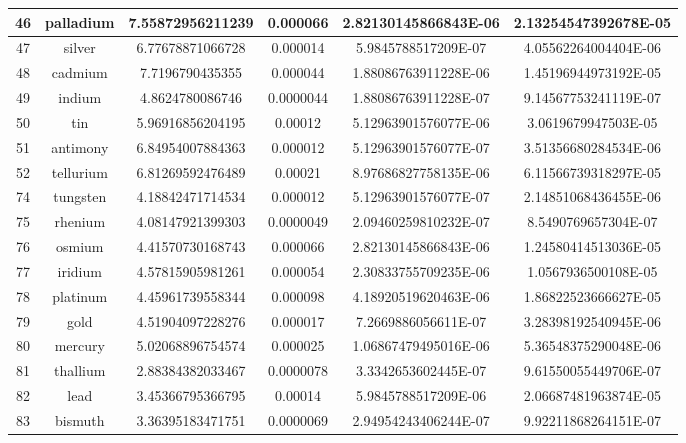 \documentclass[a4paper]{article}
\begin{document}
\begin{center}
\begin{tabular}{|c|c|c|c|c|c|}
			\hline
			46 & palladium & 7.55872956211239 & 0.000066 & 2.82130145866843E-06 & 2.13254547392678E-05 \\
			\hline
			47 & silver & 6.77678871066728 & 0.000014 & 5.9845788517209E-07 & 4.05562264004404E-06 \\
			\hline
			48 & cadmium & 7.7196790435355 & 0.000044 & 1.88086763911228E-06 & 1.45196944973192E-05 \\
			\hline
			49 & indium & 4.8624780086746 & 0.0000044 & 1.88086763911228E-07 & 9.14567753241119E-07 \\
			\hline
			50 & tin & 5.96916856204195 & 0.00012 & 5.12963901576077E-06 & 3.0619679947503E-05 \\
			\hline
			51 & antimony & 6.84954007884363 & 0.000012 & 5.12963901576077E-07 & 3.51356680284534E-06 \\
			\hline
			52 & tellurium & 6.81269592476489 & 0.00021 & 8.97686827758135E-06 & 6.11566739318297E-05 \\
			\hline
			74 & tungsten & 4.18842471714534 & 0.000012 & 5.12963901576077E-07 & 2.14851068436455E-06 \\
			\hline
			75 & rhenium & 4.08147921399303 & 0.0000049 & 2.09460259810232E-07 & 8.5490769657304E-07 \\
			\hline
			76 & osmium & 4.41570730168743 & 0.000066 & 2.82130145866843E-06 & 1.24580414513036E-05 \\
			\hline
			77 & iridium & 4.57815905981261 & 0.000054 & 2.30833755709235E-06 & 1.0567936500108E-05 \\
			\hline
			78 & platinum & 4.45961739558344 & 0.000098 & 4.18920519620463E-06 & 1.86822523666627E-05 \\
			\hline
			79 & gold & 4.51904097228276 & 0.000017 & 7.2669886056611E-07 & 3.28398192540945E-06 \\
			\hline
			80 & mercury & 5.02068896754574 & 0.000025 & 1.06867479495016E-06 & 5.36548375290048E-06 \\
			\hline
			81 & thallium & 2.88384382033467 & 0.0000078 & 3.3342653602445E-07 & 9.61550055449706E-07 \\
			\hline
			82 & lead & 3.45366795366795 & 0.00014 & 5.9845788517209E-06 & 2.06687481963874E-05 \\
			\hline
			83 & bismuth & 3.36395183471751 & 0.0000069 & 2.94954243406244E-07 & 9.92211868264151E-07 \\
			\hline
		\end{tabular}
	\end{center}
	
\end{document}
